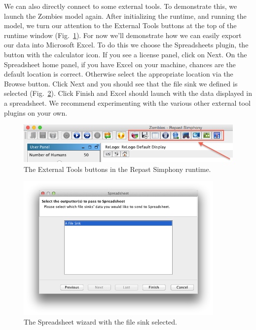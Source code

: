 \documentclass[11pt]{amsart}
\begin{document}
We can also directly connect to some external tools. To demonstrate this, we launch the Zombies model again. After initializing the runtime, and running the model, we turn our attention to the External Tools buttons at the top of the runtime window (Fig.~\ref{fig:externaltools}). For now we'll demonstrate how we can easily export our data into Microsoft Excel. To do this we choose the Spreadsheets plugin, the button with the calculator icon. If you see a license panel, click on Next. On the Spreadsheet home panel, if you have Excel on your machine, chances are the default location is correct. Otherwise select the appropriate location via the Browse button. Click Next and you should see that the file sink we defined is selected (Fig.~\ref{fig:spreadsheet}). Click Finish and Excel should launch with the data displayed in a spreadsheet. We recommend experimenting with the various other external tool plugins on your own.

\begin{figure}
\begin{center}
\vspace{.2in}
\centerline {
\includegraphics[width=5in]{GettingStartedImages/ExternalTools.png}
}
\caption{The External Tools buttons in the Repast Simphony runtime.}
\label{fig:externaltools}
\end{center}
\end{figure}

\begin{figure}
\begin{center}
\vspace{.2in}
\centerline {
\includegraphics[width=4in]{GettingStartedImages/Spreadsheet.png}
}
\caption{The Spreadsheet wizard with the file sink selected.}
\label{fig:spreadsheet}
\end{center}
\end{figure}
\end{document}
